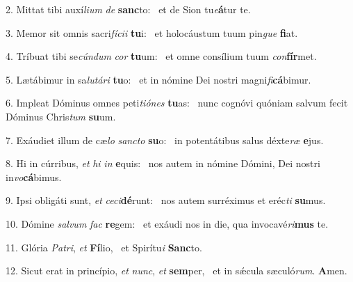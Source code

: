 2. Mittat tibi auxí\textit{li}\textit{um} \textit{de} \textbf{sanc}to: \ast\  et de Sion tu\textit{e}\textbf{á}tur te.\

3. Memor sit omnis sacri\textit{fí}\textit{ci}\textit{i} \textbf{tu}i: \ast\  et holocáustum tuum pin\textit{gue} \textbf{fi}at.\

4. Tríbuat tibi se\textit{cún}\textit{dum} \textit{cor} \textbf{tu}um: \ast\  et omne consílium tuum \textit{con}\textbf{fír}met.\

5. Lætábimur in sa\textit{lu}\textit{tá}\textit{ri} \textbf{tu}o: \ast\  et in nómine Dei nostri magni\textit{fi}\textbf{cá}bimur.\

6. Impleat Dóminus omnes peti\textit{ti}\textit{ó}\textit{nes} \textbf{tu}as: \ast\  nunc cognóvi quóniam salvum fecit Dóminus Chris\textit{tum} \textbf{su}um.\

7. Exáudiet illum de cæ\textit{lo} \textit{sanc}\textit{to} \textbf{su}o: \ast\  in potentátibus salus déxte\textit{ræ} \textbf{e}jus.\

8. Hi in cúrribus, \textit{et} \textit{hi} \textit{in} \textbf{e}quis: \ast\  nos autem in nómine Dómini, Dei nostri in\textit{vo}\textbf{cá}bimus.\

9. Ipsi obligáti sunt, \textit{et} \textit{ce}\textit{ci}\textbf{dé}runt: \ast\  nos autem surréximus et eréc\textit{ti} \textbf{su}mus.\

10. Dómine \textit{sal}\textit{vum} \textit{fac} \textbf{re}gem: \ast\  et exáudi nos in die, qua invocavé\textit{ri}\textbf{mus} te.\

11. Glória \textit{Pa}\textit{tri}, \textit{et} \textbf{Fí}lio, \ast\  et Spirítu\textit{i} \textbf{Sanc}to.\

12. Sicut erat in princípio, \textit{et} \textit{nunc}, \textit{et} \textbf{sem}per, \ast\  et in sǽcula sæculó\textit{rum}. \textbf{A}men.\

